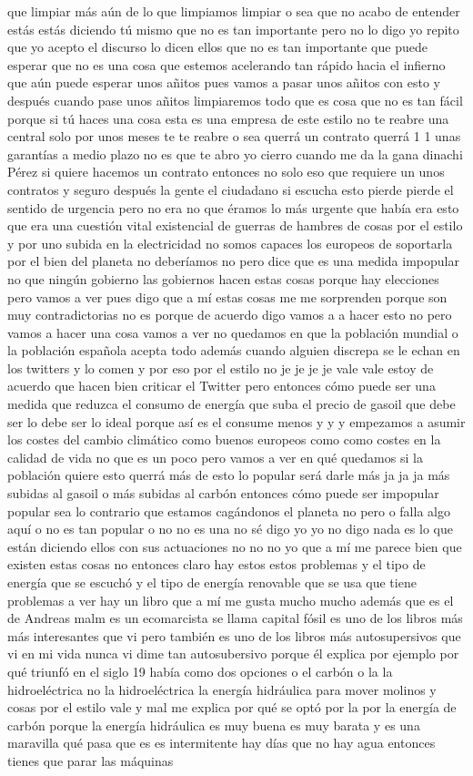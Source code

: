 que limpiar más aún de lo que limpiamos limpiar o sea que no acabo de entender estás estás diciendo tú mismo que no es tan importante pero no lo digo yo repito que yo acepto el discurso lo dicen ellos que no es tan importante que puede esperar que no es una cosa que estemos acelerando tan rápido hacia el infierno que aún puede esperar unos añitos pues vamos a pasar unos añitos con esto y después cuando pase unos añitos limpiaremos todo que es cosa que no es tan fácil porque si tú haces una cosa esta es una empresa de este estilo no te reabre una central solo por unos meses te te reabre o sea querrá un contrato querrá 1 1 unas garantías a medio plazo no es que te abro yo cierro cuando me da la gana dinachi Pérez si quiere hacemos un contrato entonces no solo eso que requiere un unos contratos y seguro después la gente el ciudadano si escucha esto pierde pierde el sentido de urgencia pero no era no que éramos lo más urgente que había era esto que era una cuestión vital existencial de guerras de hambres de cosas por el estilo y por uno subida en la electricidad no somos capaces los europeos de soportarla por el bien del planeta no deberíamos no pero dice que es una medida impopular no que ningún gobierno las gobiernos hacen estas cosas porque hay elecciones pero vamos a ver pues digo que a mí estas cosas me me sorprenden porque son muy contradictorias no es porque de acuerdo digo vamos a a hacer esto no pero vamos a hacer una cosa vamos a ver no quedamos en que la población mundial o la población española acepta todo además cuando alguien discrepa se le echan en los twitters y lo comen y por eso por el estilo no je je je je vale vale estoy de acuerdo que hacen bien criticar el Twitter pero entonces cómo puede ser una medida que reduzca el consumo de energía que suba el precio de gasoil que debe ser lo debe ser lo ideal porque así es el consume menos y y y empezamos a asumir los costes del cambio climático como buenos europeos como como costes en la calidad de vida no que es un poco pero vamos a ver en qué quedamos si la población quiere esto querrá más de esto lo popular será darle más ja ja ja más subidas al gasoil o más subidas al carbón entonces cómo puede ser impopular popular sea lo contrario que estamos cagándonos el planeta no pero o falla algo aquí o no es tan popular o no no es una no sé digo yo yo no digo nada es lo que están diciendo ellos con sus actuaciones no no no yo que a mí me parece bien que existen estas cosas no entonces claro hay estos estos problemas y el tipo de energía que se escuchó y el tipo de energía renovable que se usa que tiene problemas a ver hay un libro que a mí me gusta mucho mucho además que es el de Andreas malm es un ecomarcista se llama capital fósil es uno de los libros más más interesantes que vi pero también es uno de los libros más autosupersivos que vi en mi vida nunca vi dime tan autosubersivo porque él explica por ejemplo por qué triunfó en el siglo 19 había como dos opciones o el carbón o la la hidroeléctrica no la hidroeléctrica la energía hidráulica para mover molinos y cosas por el estilo vale y mal me explica por qué se optó por la por la energía de carbón porque la energía hidráulica es muy buena es muy barata y es una maravilla qué pasa que es es intermitente hay días que no hay agua entonces tienes que parar las máquinas 